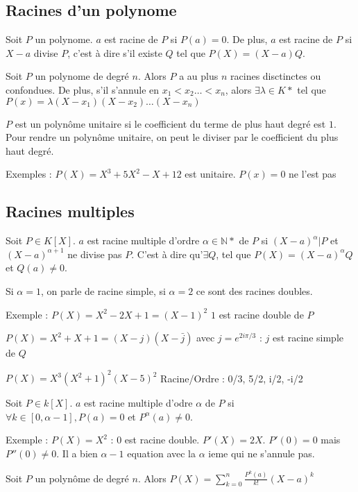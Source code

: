 \documentclass[french]{yLectureNote}
\begin{document}
\subsection{Racines d'un polynome}
\begin{definition}[Racine]
Soit $P$ un polynome. $a$ est racine de $P$ si $P(a) = 0$. De plus, $a$ est racine de $P$ si $X-a$ divise $P$, c'est à dire s'il existe $Q$ tel que $P(X) = (X-a)Q$.
\end{definition}
\begin{theorem}
Soit $P$ un polynome de degré $n$. Alors $P$ a au plus $n$ racines disctinctes ou confondues. De plus, s'il s'annule en $x_1<x_2\dots<x_n$, alors $\exists \lambda \in K*$ tel que $P(x) = \lambda(X-x_1)(X-x_2)\dots(X-x_n)$
\end{theorem}
\begin{definition}
$P$ est un polyn\^ome unitaire si le coefficient du terme de plus haut degré est $1$. Pour rendre un polyn\^ome unitaire, on peut le diviser par le coefficient du plus haut degré.
\end{definition}
Exemples : $P(X)  =X^3+5X^2-X+12$ est unitaire. $P(x) = 0$ ne l'est pas
\subsection{Racines multiples}
\begin{definition}
Soit $P\in K[X]$. $a$ est racine multiple d'ordre $\alpha \in \mathbb{N}*$ de $P$ si $(X-a)^{\alpha}|P$ et $(X-a)^{\alpha+1}$ ne divise pas $P$. C'est à dire qu'$\exists Q$, tel que $P(X) = (X-a)^\alpha Q$ et $Q(a)\neq 0$.
\end{definition}
Si $\alpha = 1$, on parle de racine simple, si $\alpha = 2$ ce sont des racines doubles.

Exemple : $P(X) = X^2-2X+1 = (X-1)^2$ $1$ est racine double de $P$

$P(X) = X^2+X+1 = (X-j)(X-\bar{j})$ avec $j = e^{2i\pi/3}$ : $j$ est racine simple de $Q$

$P(X) = X^3(X^2+1)^2(X-5)^2$
Racine/Ordre : 0/3, 5/2, i/2, -i/2

\begin{theorem}
Soit $P\in k[X]$. $a$ est racine multiple d'odre $\alpha$ de $P$ si $\forall k\in[0,\alpha-1], P(a) = 0$ et $P^\alpha(a) \neq 0$.
\end{theorem}
Exemple : $P(X) = X^2$ : $0$ est racine double. $P'(X)=2X$. $P'(0)=0$ mais $P''(0)\neq 0$. Il a bien $\alpha-1$ equation avec la $\alpha$ ieme qui ne s'annule pas.
\begin{lemma}
Soit $P$ un polyn\^ome de degré $n$. Alors $P(X) = \sum_{k=0}^n \frac{P^k(a)}{k!}(X-a)^k$
\end{lemma}
\end{document}
